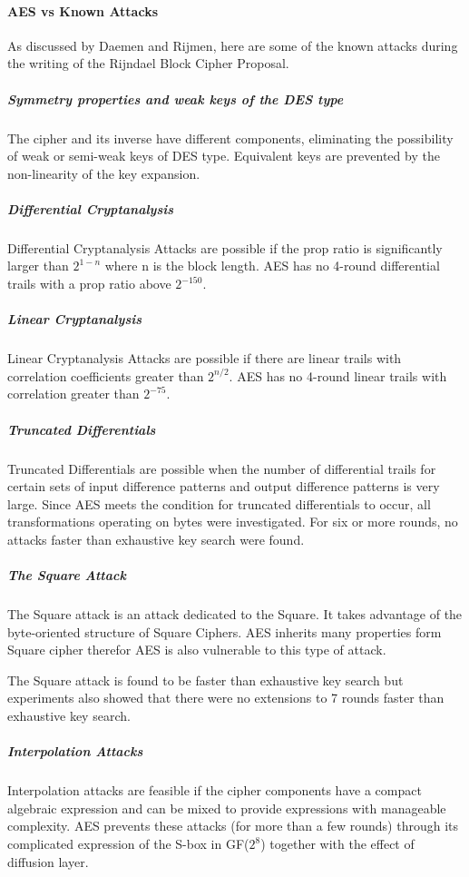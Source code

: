 \documentclass{article}
\begin{document}
\paragraph{AES vs Known Attacks}
As discussed by Daemen and Rijmen\cite{daemen1999}, here are some of the known attacks during the writing of the Rijndael Block Cipher Proposal.

\subparagraph{Symmetry properties and weak keys of the DES type}
The cipher and its inverse have different components, eliminating the possibility of weak or semi-weak keys of DES type. Equivalent keys are prevented by the non-linearity of the key expansion.

\subparagraph{Differential Cryptanalysis}
Differential Cryptanalysis Attacks are possible if the prop ratio is significantly larger than $2^{1-n}$ where n is the block length. AES has no 4-round differential trails with a prop ratio above $2^{-150}$.

\subparagraph{Linear Cryptanalysis}
Linear Cryptanalysis Attacks are possible if there are linear trails with correlation coefficients greater than $2^{n/2}$. AES has no 4-round linear trails with correlation greater than $2^{-75}$.

\subparagraph{Truncated Differentials}
Truncated Differentials are possible when the number of differential trails for certain sets of input difference patterns and output difference patterns is very large. Since AES meets the condition for truncated differentials to occur, all transformations operating on bytes were investigated. For six or more rounds, no attacks faster than exhaustive key search were found.

\subparagraph{The Square Attack}
The Square attack is an attack dedicated to the Square. It takes advantage of the byte-oriented structure of Square Ciphers. AES inherits many properties form Square cipher therefor AES is also vulnerable to this type of attack.

The Square attack is found to be faster than exhaustive key search but experiments also showed that there were no extensions to 7 rounds faster than exhaustive key search.

\subparagraph{Interpolation Attacks}
Interpolation attacks are feasible if the cipher components have a compact algebraic expression and can be mixed to provide expressions with manageable complexity. AES prevents these attacks (for more than a few rounds) through its complicated expression of the S-box in GF($2^{8}$) together with the effect of diffusion layer.
\end{document}
